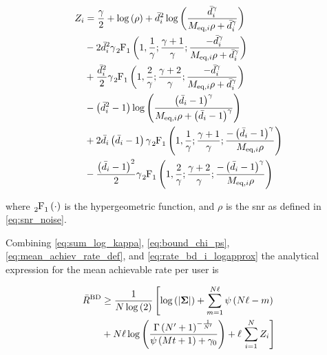 \begin{equation} \label{eq:zi_chapter}
\begin{aligned}
    Z_i &= \frac{\gamma}{2} + \log\left(\rho\right) + \bar{d}_i^2\log\left(
    \frac{\bar{d}_i^{\gamma}}{\Meqi \rho + \bar{d}_i^{\gamma}}\right)\\
    &- 2 \bar{d}_i^2\gamma \hgeo \left(1,\frac{1}{\gamma};
    \frac{\gamma+1}{\gamma};\frac{-\bar{d}_i^{\gamma}}{\Meqi\rho +
    \bar{d}_i^{\gamma}}\right)\\
    &+ \frac{\bar{d}_i^2}{2}\gamma \hgeo\left(1, \frac{2}{\gamma};
    \frac{\gamma+2}{\gamma};\frac{-\bar{d}_i^{\gamma}}{\Meqi\rho +
    \bar{d}_i^{\gamma}}\right)\\
    &- \left(\bar{d}_i^2-1\right)\log\left(
    \frac{\left(\bar{d}_i-1\right)^{\gamma}}
    {\Meqi\rho+\left(\bar{d}_i - 1\right)^{\gamma}}\right)\\
    &+ 2\bar{d}_i\left(\bar{d}_i - 1\right)\gamma\hgeo\left(1,\frac{1}{\gamma};
    \frac{\gamma + 1}{\gamma};\frac{-\left(\bar{d}_i-1\right)^{\gamma}}
    {\Meqi\rho}\right)\\
    &- \frac{\left(\bar{d}_i-1\right)^2}{2}\gamma\hgeo\left(1,\frac{2}{\gamma};
    \frac{\gamma + 2}{\gamma};\frac{-\left(\bar{d}_i-1\right)^{\gamma}}
    {\Meqi\rho}\right)
\end{aligned}
\end{equation}

\noindent
where $\hgeo\left(\cdot\right)$ is the hypergeometric function, and $\rho$ is
the \gls{snr} as defined in \eqref{eq:snr_noise}.

Combining \eqref{eq:sum_log_kappa}, \eqref{eq:bound_chi_ps},
\eqref{eq:mean_achiev_rate_def}, and \eqref{eq:rate_bd_i_logapprox} the
analytical expression for the mean achievable rate per user is

\begin{equation} \label{eq:mean_achiev_rate}
\begin{aligned}
    \bar{R}^{\text{BD}} &\geq \frac{1}{N\log\left(2\right)}
    \left[ \log\left(\left|\mathbf{\Sigma}\right|\right) +
    \sum\limits_{m=1}^{N\ell}\psi\left(N\ell-m\right) \right.\\
    &+N\ell \log\left(\frac{\Gamma\left(N^{\prime} + 1\right)^{-\frac{1}{N^{\prime}}}}
    {\psi\left(Mt + 1\right) + \gamma_0}\right)+\ell \left.
    \sum\limits_{i=1}^N Z_i\right]
\end{aligned}
\end{equation}


